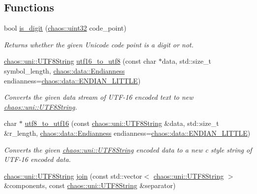 \subsection*{Functions}
\begin{DoxyCompactItemize}
\item 
bool \hyperlink{namespacechaos_1_1uni_a25a7549a0378aeac227c881220c23640}{is\+\_\+digit} (\hyperlink{namespacechaos_a8641b3ae4551f0b35570d4f9f4ec22d9}{chaos\+::uint32} code\+\_\+point)
\begin{DoxyCompactList}\small\item\em Returns whether the given Unicode code point is a digit or not. \end{DoxyCompactList}\item 
\hyperlink{classchaos_1_1uni_1_1_u_t_f8_string}{chaos\+::uni\+::\+U\+T\+F8\+String} \hyperlink{namespacechaos_1_1uni_abde7063d11cab650cbe316f20b94c4e9}{utf16\+\_\+to\+\_\+utf8} (const char $\ast$data, std\+::size\+\_\+t symbol\+\_\+length, \hyperlink{namespacechaos_1_1data_adb2657d50c0b84cdc1153001031bbf3f}{chaos\+::data\+::\+Endianness} endianness=\hyperlink{namespacechaos_1_1data_adb2657d50c0b84cdc1153001031bbf3fa7fc5455bb6147c278dfa4a84e255c66d}{chaos\+::data\+::\+E\+N\+D\+I\+A\+N\+\_\+\+L\+I\+T\+T\+L\+E})
\begin{DoxyCompactList}\small\item\em Converts the given data stream of U\+T\+F-\/16 encoded text to new \hyperlink{classchaos_1_1uni_1_1_u_t_f8_string}{chaos\+::uni\+::\+U\+T\+F8\+String}. \end{DoxyCompactList}\item 
char $\ast$ \hyperlink{namespacechaos_1_1uni_a3ec4746c1c3433619edfd24c8b0b8b9d}{utf8\+\_\+to\+\_\+utf16} (const \hyperlink{classchaos_1_1uni_1_1_u_t_f8_string}{chaos\+::uni\+::\+U\+T\+F8\+String} \&data, std\+::size\+\_\+t \&r\+\_\+length, \hyperlink{namespacechaos_1_1data_adb2657d50c0b84cdc1153001031bbf3f}{chaos\+::data\+::\+Endianness} endianness=\hyperlink{namespacechaos_1_1data_adb2657d50c0b84cdc1153001031bbf3fa7fc5455bb6147c278dfa4a84e255c66d}{chaos\+::data\+::\+E\+N\+D\+I\+A\+N\+\_\+\+L\+I\+T\+T\+L\+E})
\begin{DoxyCompactList}\small\item\em Converts the given \hyperlink{classchaos_1_1uni_1_1_u_t_f8_string}{chaos\+::uni\+::\+U\+T\+F8\+String} encoded data to a new c style string of U\+T\+F-\/16 encoded data. \end{DoxyCompactList}\item 
\hyperlink{classchaos_1_1uni_1_1_u_t_f8_string}{chaos\+::uni\+::\+U\+T\+F8\+String} \hyperlink{namespacechaos_1_1uni_ad2a77983423c8b10e2b18cae6f35d329}{join} (const std\+::vector$<$ \hyperlink{classchaos_1_1uni_1_1_u_t_f8_string}{chaos\+::uni\+::\+U\+T\+F8\+String} $>$ \&components, const \hyperlink{classchaos_1_1uni_1_1_u_t_f8_string}{chaos\+::uni\+::\+U\+T\+F8\+String} \&separator)

\end{DoxyCompactItemize}
